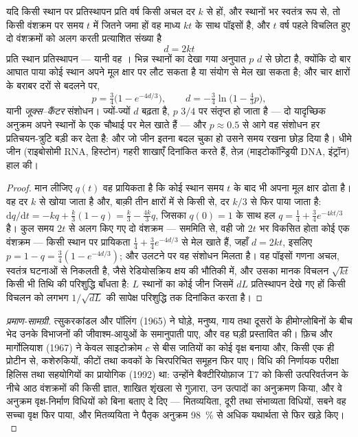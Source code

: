 \begin{theorem}[पॉइसों प्रक्रम के रूप में प्रतिस्थापन, और बहु-आघातों का संशोधन]\label{thm:b2:phylogenetic-trees:clock}
यदि किसी स्थान पर प्रतिस्थापन प्रति वर्ष किसी अचल दर $k$ से हों,
और स्थानों भर स्वतंत्र रूप से, तो किसी वंशक्रम पर समय $t$ में जितने
जमा हों वह माध्य $kt$ के साथ पॉइसों है, और $t$ वर्ष पहले विचलित हुए
दो वंशक्रमों को अलग करती प्रत्याशित संख्या है
\[
d = 2kt
\]
प्रति स्थान प्रतिस्थापन --- यानी वह \emph{}। भिन्न स्थानों का
देखा गया अनुपात $p$ $d$ से छोटा है, क्योंकि
दो बार आघात पाया कोई स्थान अपने मूल क्षार पर लौट सकता है या संयोग से मेल खा सकता है;
और चार क्षारों के बराबर दरों से बदलने पर,
\[
p = \tfrac{3}{4}\bigl(1 - e^{-4d/3}\bigr), \qquad
d = -\tfrac{3}{4}\ln\bigl(1 - \tfrac{4}{3}p\bigr),
\]
यानी \emph{जूक्स--कैंटर} संशोधन। ज्यों-ज्यों $d$ बढ़ता है, $p$
$3/4$ पर संतृप्त हो जाता है --- दो यादृच्छिक अनुक्रम अपने स्थानों के एक चौथाई पर मेल खाते हैं
--- और $p \approx 0.5$ से आगे वह संशोधन हर
प्रतिचयन-त्रुटि बड़ी कर देता है: और जो जीन इतना बदल चुका हो उसने
समय रखना छोड़ दिया है। धीमे जीन (राइबोसोमी RNA, हिस्टोन) गहरी
शाखाएँ दिनांकित करते हैं, तेज़ (माइटोकॉन्ड्रियी DNA, इंट्रॉन) हाल की।
\end{theorem}
\begin{proof}
मान लीजिए $q(t)$ वह प्रायिकता है कि कोई स्थान समय $t$ के बाद भी अपना
मूल क्षार ढोता है। वह दर $k$ से खोया जाता है और, बाक़ी तीन क्षारों में से
किसी से, दर $k/3$ से फिर पाया जाता है:
$\mathrm{d}q/\mathrm{d}t = -kq + \tfrac{k}{3}(1 - q) = \tfrac{k}{3} -
\tfrac{4k}{3}q$, जिसका $q(0) = 1$ के साथ हल $q = \tfrac14 +
\tfrac34 e^{-4kt/3}$ है। कुल समय $2t$ से अलग किए गए दो वंशक्रम ---
सममिति से, वही जो $2t$ भर विकसित होता कोई एक वंशक्रम --- किसी
स्थान पर प्रायिकता $\tfrac14 + \tfrac34 e^{-4d/3}$ से मेल खाते हैं, जहाँ $d =
2kt$, इसलिए $p = 1 - q = \tfrac34(1 - e^{-4d/3})$; और उलटने पर वह
संशोधन मिलता है। वह पॉइसों गणना अचल, स्वतंत्र
घटनाओं से निकलती है, जैसे रेडियोसक्रिय क्षय की भौतिकी में, और उसका मानक
विचलन $\sqrt{kt}$ किसी भी तिथि की परिशुद्धि बाँधता है: $L$
स्थानों का कोई जीन जिसमें $dL$ प्रतिस्थापन देखे गए हों किसी विचलन को
लगभग $1/\sqrt{dL}$ की सापेक्ष परिशुद्धि तक दिनांकित करता है।
\end{proof}
\begin{proof}[प्रमाण-सामग्री]
त्सुकरकांडल और पॉलिंग (1965) ने घोड़े, मनुष्य, गाय तथा दूसरों के
हीमोग्लोबिनों के बीच भेद उनके विभाजनों की
जीवाश्म-आयुओं के समानुपाती पाए, और वह घड़ी प्रस्तावित की। फ़िच और
मार्गोलियाश (1967) ने केवल साइटोक्रोम $c$ से बीस जातियों का कोई वृक्ष
बनाया और, किसी एक ही प्रोटीन से, कशेरुकियों, कीटों तथा कवकों के
चिरपरिचित समूहन फिर पाए। विधि की निर्णायक परीक्षा
हिलिस तथा सहयोगियों का प्रायोगिक  (1992) था:
उन्होंने बैक्टीरियोफ़ाज T7 को किसी उत्परिवर्तजन के नीचे आठ वंशक्रमों की किसी ज्ञात, शाखित
शृंखला से गुज़ारा, उन उत्पादों का अनुक्रमण किया, और
वे अनुक्रम वृक्ष-निर्माण विधियों को बिना बताए दे दिए --- मितव्ययिता,
दूरी तथा संभाव्यता विधियों, सबने वह सच्चा वृक्ष फिर पाया, और
मितव्ययिता ने पैतृक अनुक्रम
\qty{98}{\%} से अधिक यथार्थता से फिर खड़े किए।
\end{proof}

